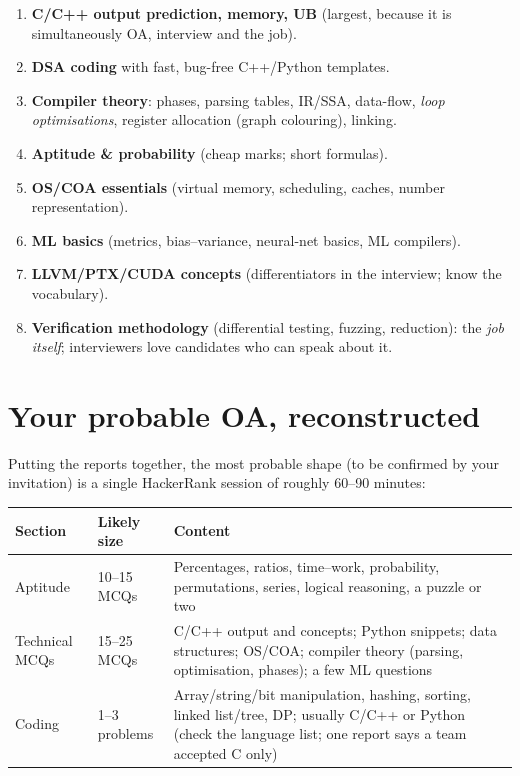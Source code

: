 \documentclass[10pt,a4paper,openany,oneside]{report}
\newcommand{\prio}[1]{\texorpdfstring{\ifcase#1\or{\color{gold}\ding{72}}\or{\color{gold}\ding{72}\ding{72}}\or{\color{gold}\ding{72}\ding{72}\ding{72}}\fi}{}}
\begin{document}
\begin{mustbox}
\begin{enumerate}[nosep]
\item \textbf{C/C++ output prediction, memory, UB} (largest, because it is simultaneously OA, interview and the job).
\item \textbf{DSA coding} with fast, bug-free C++/Python templates.
\item \textbf{Compiler theory}: phases, parsing tables, IR/SSA, data-flow, \emph{loop optimisations}, register allocation (graph colouring), linking.
\item \textbf{Aptitude \& probability} (cheap marks; short formulas).
\item \textbf{OS/COA essentials} (virtual memory, scheduling, caches, number representation).
\item \textbf{ML basics} (metrics, bias--variance, neural-net basics, ML compilers).
\item \textbf{LLVM/PTX/CUDA concepts} (differentiators in the interview; know the vocabulary).
\item \textbf{Verification methodology} (differential testing, fuzzing, reduction): the \emph{job itself}; interviewers love candidates who can speak about it.
\end{enumerate}
\end{mustbox}

\section{Your probable OA, reconstructed \prio{3}}
Putting the reports together, the most probable shape (to be confirmed by your invitation) is a single HackerRank session of roughly 60--90 minutes:
\begin{center}
\small
\begin{xltabular}{\textwidth}{@{}L{3.2cm}L{2.7cm}Y@{}}
\toprule
\textbf{Section} & \textbf{Likely size} & \textbf{Content}\\
\midrule\endhead
Aptitude & 10--15 MCQs & Percentages, ratios, time--work, probability, permutations, series, logical reasoning, a puzzle or two\\
Technical MCQs & 15--25 MCQs & C/C++ output and concepts; Python snippets; data structures; OS/COA; compiler theory (parsing, optimisation, phases); a few ML questions\\
Coding & 1--3 problems & Array/string/bit manipulation, hashing, sorting, linked list/tree, DP; usually C/C++ or Python (check the language list; one report says a team accepted C only)\\
\bottomrule
\end{xltabular}
\end{center}
\end{document}

